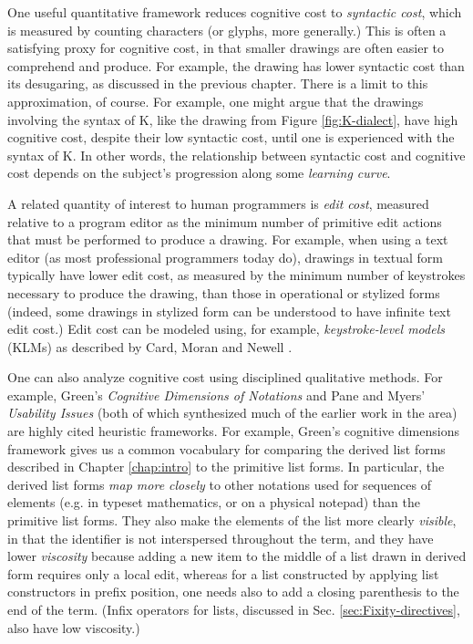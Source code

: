 One useful quantitative framework reduces cognitive cost to \emph{syntactic cost}, which is measured by counting characters (or glyphs, more generally.) This is often a satisfying proxy for cognitive cost, in that smaller drawings are often easier to comprehend and produce. For example, the drawing \li{[x, y, z]} has lower syntactic cost than its desugaring, as discussed in the previous chapter. There is a limit to this approximation, of course. For example, one might argue that the drawings involving the syntax of K, like the drawing from Figure \ref{fig:K-dialect}, have high cognitive cost, despite their low syntactic cost, until one is experienced with the syntax of K. In other words, the relationship between syntactic cost and cognitive cost depends on the subject's progression along some \emph{learning curve}.

A related quantity of interest to human programmers is \emph{edit cost}, measured relative to a program editor as the minimum number of primitive edit actions that must be performed to produce a drawing. For example, when using a text editor (as most professional programmers today do), drawings in textual form typically have lower edit cost, as measured by the minimum number of keystrokes necessary to produce the drawing, than those in operational or stylized forms (indeed, some drawings in stylized form can be understood to have infinite text edit cost.) Edit cost can be modeled using, for example, \emph{keystroke-level models} (KLMs) as described by Card, Moran and Newell \cite{journals/cacm/CardMN80}.%

One can also analyze cognitive cost using disciplined qualitative methods. For example, Green's \emph{Cognitive Dimensions of Notations} \cite{Green89,green1996usability} and Pane and Myers' \emph{Usability Issues} \cite{pane1996usability} (both of which synthesized much of the earlier work in the area) are highly cited heuristic frameworks. For example, Green's cognitive dimensions framework gives us a common vocabulary for  comparing the derived list forms described in Chapter \ref{chap:intro} to the primitive list forms. In particular, the derived list forms \emph{map more closely} to other notations used for sequences of elements (e.g. in typeset mathematics, or on a physical notepad) than the primitive list forms. They also make the elements of the list more clearly \emph{visible}, in that the identifier  is not interspersed throughout the term, and they have lower \emph{viscosity} because adding a new item to the middle of a list drawn in derived form requires only a local edit, whereas for a list constructed by applying list constructors in prefix position, one needs also to add a closing parenthesis to the end of the term. (Infix operators for lists, discussed in Sec. \ref{sec:Fixity-directives}, also have low viscosity.)

